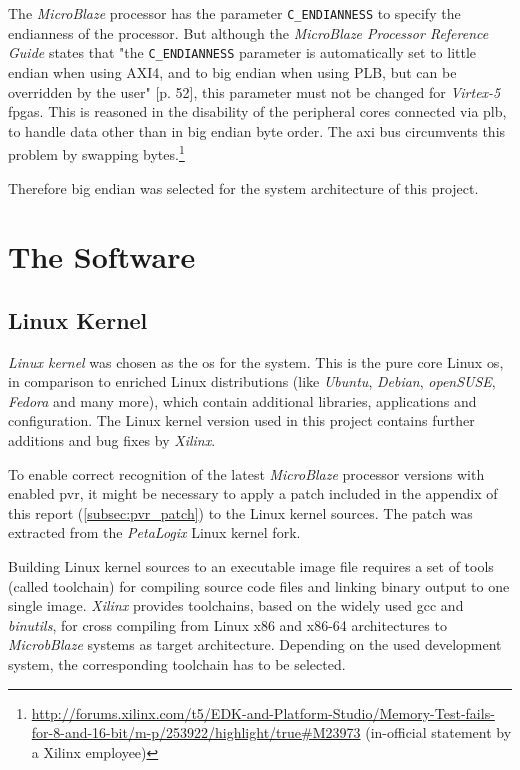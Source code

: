 The \textit{MicroBlaze} processor has the parameter \texttt{C\_ENDIANNESS} to specify the endianness of the processor. But although the \textit{MicroBlaze Processor Reference Guide} states that "the \texttt{C\_ENDIANNESS} parameter is automatically set to little endian when using AXI4, and to big endian when using PLB, but can be overridden by the user" \cite{mb_ref}[p. 52], this parameter must not be changed for \textit{Virtex-5} \gls{fpga}s. This is reasoned in the disability of the peripheral cores connected via \gls{plb}, to handle data other than in big endian byte order. The \gls{axi} bus circumvents this problem by swapping bytes.\footnote{\url{http://forums.xilinx.com/t5/EDK-and-Platform-Studio/Memory-Test-fails-for-8-and-16-bit/m-p/253922/highlight/true\#M23973} (in-official statement by a Xilinx employee)}

Therefore big endian was selected for the system architecture of this project.

\clearpage
\section{The Software}

\subsection{Linux Kernel}

\textit{Linux kernel} was chosen as the \gls{os} for the system. This is the pure core Linux \gls{os}, in comparison to enriched Linux distributions (like \textit{Ubuntu}, \textit{Debian}, \textit{openSUSE}, \textit{Fedora} and many more), which contain additional libraries, applications and configuration. The Linux kernel version used in this project contains further additions and bug fixes by \textit{Xilinx}.

To enable correct recognition of the latest \textit{MicroBlaze} processor versions with enabled \gls{pvr}, it might be necessary to apply a patch included in the appendix of this report (\ref{subsec:pvr_patch}) to the Linux kernel sources. The patch was extracted from the \textit{PetaLogix} Linux kernel fork.

Building Linux kernel sources to an executable image file requires a set of tools (called toolchain) for compiling source code files and linking binary output to one single image. \textit{Xilinx} provides toolchains, based on the widely used \gls{gcc} and \textit{binutils}, for cross compiling from Linux x86 and x86-64 architectures to \textit{MicrobBlaze} systems as target architecture. Depending on the used development system, the corresponding toolchain has to be selected.
\\

